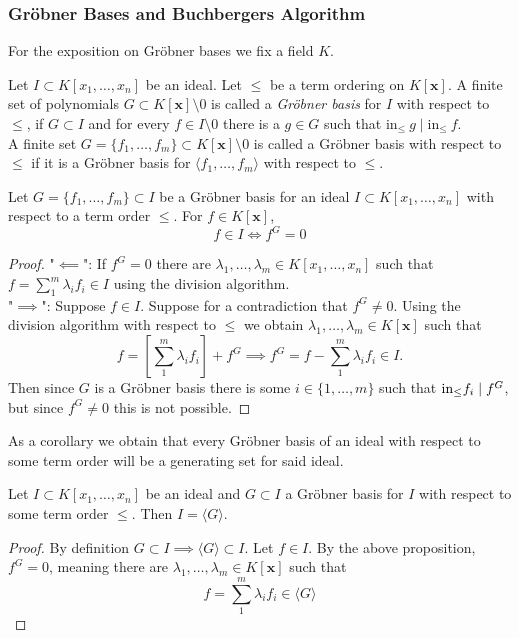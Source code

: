 \subsubsection{Gröbner Bases and Buchbergers Algorithm}
For the exposition on Gröbner bases we fix a field $K$.
\begin{definition}\label{GBDef}
    Let $I\subset K[x_1,\dots,x_n]$ be an ideal. Let $\leq$ be a term ordering on $K[\mathbf{x}]$. A finite set of polynomials $G\subset K[\mathbf{x}]\setminus 0$ is called a \textit{Gröbner basis} for $I$ with respect to $\leq$, if $G\subset I$ and for every $f\in I\setminus 0$ there is a $g\in G$ such that $\text{in}_\leq\ g \mid \text{in}_\leq \ f$.\\
    A finite set $G=\{f_1,\dots,f_m\}\subset K[\mathbf{x}]\setminus 0$ is called a Gröbner basis with respect to $\leq$ if it is a Gröbner basis for $\langle f_1,\dots,f_m\rangle$ with respect to $\leq$.
\end{definition}
\begin{proposition}\label{GBCriterionForCheckingMembership}
    Let $G=\{f_1,\dots,f_m\}\subset I$ be a Gröbner basis for an ideal $I\subset K[x_1,\dots,x_n]$ with respect to a term order $\leq$. For $f\in K[\mathbf{x}]$,
    $$f\in I \iff f^G = 0$$
\end{proposition}
\begin{proof}
    "$\impliedby$": If $f^G=0$ there are $\lambda_1,\dots,\lambda_m\in K[x_1,\dots,x_n]$ such that $f = \sum_1^m \lambda_if_i\in I$ using the division algorithm.\\
    "$\implies$": Suppose $f\in I$. Suppose for a contradiction that $f^G\neq 0$. Using the division algorithm with respect to $\leq$ we obtain $\lambda_1,\dots,\lambda_m\in K[\mathbf{x}]$ such that 
    $$f = \left[\sum_1^m \lambda_if_i\right]+f^G\implies f^G = f-\sum_1^m \lambda_if_i\in I.$$
    Then since $G$ is a Gröbner basis there is some $i\in\{1,\dots,m\}$ such that $\mathrm{in}_\leq f_i\mid f^G$, but since $f^G\neq0$ this is not possible.
\end{proof}
As a corollary we obtain that every Gröbner basis of an ideal with respect to some term order will be a generating set for said ideal.
\begin{corollary}
    Let $I\subset K[x_1,\dots,x_n]$ be an ideal and $G\subset I$ a Gröbner basis for $I$ with respect to some term order $\leq$. Then $I=\langle G\rangle$.
\end{corollary}
\begin{proof}
    By definition $G\subset I\implies \langle G\rangle \subset I$. Let $f\in I$. By the above proposition, $f^G=0$, meaning there are $\lambda_1,\dots,\lambda_m\in K[\mathbf{x}]$ such that 
    $$f = \sum_1^m \lambda_if_i\in \langle G\rangle$$
\end{proof}
